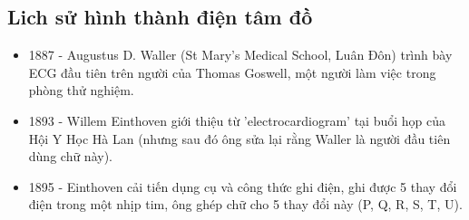 \subsection{Lich sử hình thành điện tâm đồ}
\begin{itemize}
    \item 1887 - Augustus D. Waller (St Mary's Medical School, Luân Đôn) trình bày ECG đầu tiên trên người của Thomas Goswell, một người làm việc trong phòng thử nghiệm.
    \item 1893 - Willem Einthoven giới thiệu từ 'electrocardiogram' tại buổi họp của Hội Y Học Hà Lan (nhưng sau đó ông sửa lại rằng Waller là người đầu tiên dùng chữ này).
    \item 1895 - Einthoven cải tiến dụng cụ và công thức ghi điện, ghi được 5 thay đổi điện trong một nhịp tim, ông ghép chữ cho 5 thay đổi này (P, Q, R, S, T, U).
\end{itemize}

